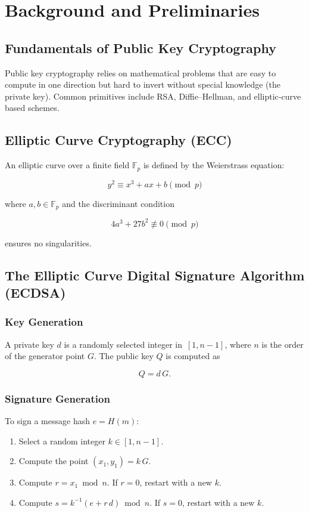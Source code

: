 \chapter{Background and Preliminaries}

\section{Fundamentals of Public Key Cryptography}

Public key cryptography relies on mathematical problems that are easy to compute in one direction but hard to invert without special knowledge (the private key). Common primitives include RSA, Diffie–Hellman, and elliptic‐curve based schemes.

\section{Elliptic Curve Cryptography (ECC)}

An elliptic curve over a finite field \(\mathbb{F}_p\) is defined by the Weierstrass equation:

\[
y^2 \equiv x^3 + a x + b \pmod{p}
\]

where \(a, b \in \mathbb{F}_p\) and the discriminant condition

\[
4a^3 + 27b^2 \not\equiv 0 \pmod{p}
\]

ensures no singularities.

\section{The Elliptic Curve Digital Signature Algorithm (ECDSA)}

\subsection{Key Generation}

A private key \(d\) is a randomly selected integer in \(\,[1, n-1]\), where \(n\) is the order of the generator point \(G\).  
The public key \(Q\) is computed as

\[
Q = d\,G.
\]

\subsection{Signature Generation}

To sign a message hash \(e = H(m)\):

\begin{enumerate}
	\item Select a random integer \(k \in [1, n-1]\).
	\item Compute the point \((x_1, y_1) = k\,G\).
	\item Compute \(r = x_1 \bmod n\). If \(r = 0\), restart with a new \(k\).
	\item Compute \(s = k^{-1}(e + r\,d) \bmod n\). If \(s = 0\), restart with a new \(k\).
\end{enumerate}

